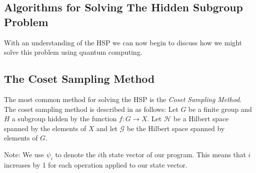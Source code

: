 \documentclass{article}
\theoremstyle{plain}
\theoremstyle{centered}
\renewcommand{\cal}[1]{\mathcal{#1}}
\begin{document}
\subsection{Algorithms for Solving The Hidden Subgroup Problem}\label{sec:HSP_algorithms}
    With an understanding of the HSP we can now begin to discuss how we might solve this problem using quantum computing.

    \subsection{The Coset Sampling Method}\label{HSP_algorithms:coset_sampling_method}
        The most common method for solving the HSP is the \textit{Coset Sampling Method}.\\
        The coset sampling method is described in \cite{perepechaenko} as follows:
        Let $G$ be a finite group and $H$ a subgroup hidden by the function $f : G \to X$. Let $\cal{H}$ be a Hilbert space spanned by the elements of $X$ and let $\cal{G}$ be the Hilbert space spanned by elements of $G$.

        Note: We use $\psi_i$ to denote the $i$th state vector of our program. 
        This means that $i$ increases by 1 for each operation applied to our state vector.
        
\end{document}
